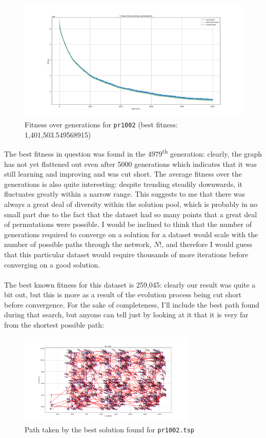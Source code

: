 \documentclass[a4paper]{article}
\begin{document}
\begin{figure}[H]
    \centering
    \includegraphics[width=\textwidth]{./images/pr1002fitness.png}
    \caption{Fitness over generations for \texttt{pr1002} (best fitness: 1,401,503.549568915)}
\end{figure}

The best fitness in question was found in the 4979\textsuperscript{th} generation: clearly, the  graph has not yet flattened out even after 5000 generations which indicates that it was still learning and improving and was cut short.
The average fitness over the generations is also quite interesting: despite trending steadily downwards, it fluctuates greatly within a narrow range.
This suggests to me that there was always a great deal of diversity within the solution pool, which is probably in no small part due to the fact that the dataset had so many points that a great deal of permutations were possible.
I would be inclined to think that the number of generations required to converge on a solution for a dataset would scale with the number of possible paths through the network, $N!$, and therefore I would guess that this particular dataset would require thousands of more iterations before converging on a good solution.
\\\\
The best known fitness for this dataset is 259,045: clearly our result was quite a bit out, but this is more as a result of the evolution process being cut short before convergence.
For the sake of completeness, I'll include the best path found during that search, but anyone can tell just by looking at it that it is very far from the shortest possible path:

\begin{figure}[H]
    \centering
    \includegraphics[width=0.75\textwidth]{./images/pr1002path.png}
    \caption{Path taken by the best solution found for \texttt{pr1002.tsp}}
\end{figure}
\end{document}
